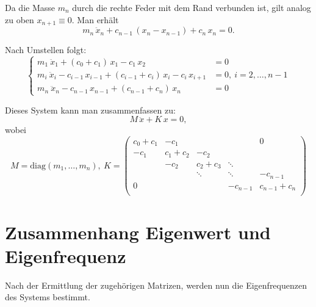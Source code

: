 \documentclass[a4paper,12pt]{report}
\newcommand{\1}{\mathds{1}}
\theoremstyle{plain} %
\theoremstyle{definition} %
\theoremstyle{remark}
\begin{document}
            Da die Masse $m_n$ durch die rechte Feder mit dem Rand verbunden ist, gilt analog zu oben $x_{n+1} \equiv 0$.
            Man erhält
            $$m_n\,\ddot x_n + c_{n-1}\,(x_n-x_{n-1}) + c_n\,x_n = 0.$$  

            Nach Umstellen folgt:
            \begin{equation}
                  \label{eqn: System GDgl MK 1d}
                  \begin{cases}
                        m_1\ \ddot x_1 + (c_0+c_1)\,x_1 - c_1\,x_2 & = 0   \\
                        m_i\ \ddot x_i - c_{i-1}\,x_{i-1} + (c_{i-1}+c_i)\,x_i -c_i\,x_{i+1} & = 0,\ i=2,\dots,n-1 \\
                        m_n\ \ddot x_n - c_{n-1}\,x_{n-1} + (c_{n-1}+c_n)\,x_n & = 0
                  \end{cases}
            \end{equation}

            Dieses System kann man zusammenfassen zu:
            $$M\,\ddot x + K\,x = 0,$$
            \renewcommand{\arraystretch}{1.5}
            wobei $$M= \text{diag}(m_1,\dots,m_n),\ 
            K = \begin{pmatrix}
                  c_0+c_1 & -c_1 &  &  & 0 \\
                  -c_1 & c_1+c_2 & -c_2 &  &  \\
                   & -c_2 & c_2+c_3 & \ddots &  \\
                    &  & \ddots & \ddots  & -c_{n-1} \\
                   0&  & & -c_{n-1} & c_{n-1}+c_n \\
                  \end{pmatrix}$$

                  
            \renewcommand{\arraystretch}{1}

            

      \section{Zusammenhang Eigenwert und Eigenfrequenz}
            Nach der Ermittlung der zugehörigen Matrizen, werden nun die Eigenfrequenzen des Systems bestimmt.
\end{document}
